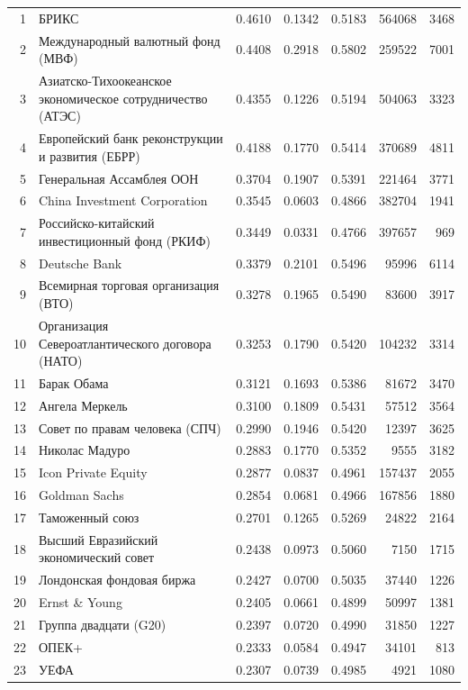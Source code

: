 {\begin{longtable}{r >{\raggedright\arraybackslash}p{4.2cm} S[table-format=1.4] S[table-format=1.4] S[table-format=1.4] r r}
1 & БРИКС & 0.4610 & 0.1342 & 0.5183 & 564068 & 3468 \\
2 & Международный валютный фонд (МВФ) & 0.4408 & 0.2918 & 0.5802 & 259522 & 7001 \\
3 & Азиатско-Тихоокеанское экономическое сотрудничество (АТЭС) & 0.4355 & 0.1226 & 0.5194 & 504063 & 3323 \\
4 & Европейский банк реконструкции и развития (ЕБРР) & 0.4188 & 0.1770 & 0.5414 & 370689 & 4811 \\
5 & Генеральная Ассамблея ООН & 0.3704 & 0.1907 & 0.5391 & 221464 & 3771 \\
6 & China Investment Corporation & 0.3545 & 0.0603 & 0.4866 & 382704 & 1941 \\
7 & Российско-китайский инвестиционный фонд (РКИФ) & 0.3449 & 0.0331 & 0.4766 & 397657 & 969 \\
8 & Deutsche Bank & 0.3379 & 0.2101 & 0.5496 & 95996 & 6114 \\
9 & Всемирная торговая организация (ВТО) & 0.3278 & 0.1965 & 0.5490 & 83600 & 3917 \\
10 & Организация Североатлантического договора (НАТО) & 0.3253 & 0.1790 & 0.5420 & 104232 & 3314 \\
11 & Барак Обама & 0.3121 & 0.1693 & 0.5386 & 81672 & 3470 \\
12 & Ангела Меркель & 0.3100 & 0.1809 & 0.5431 & 57512 & 3564 \\
13 & Совет по правам человека (СПЧ) & 0.2990 & 0.1946 & 0.5420 & 12397 & 3625 \\
14 & Николас Мадуро & 0.2883 & 0.1770 & 0.5352 & 9555 & 3182 \\
15 & Icon Private Equity & 0.2877 & 0.0837 & 0.4961 & 157437 & 2055 \\
16 & Goldman Sachs & 0.2854 & 0.0681 & 0.4966 & 167856 & 1880 \\
17 & Таможенный союз & 0.2701 & 0.1265 & 0.5269 & 24822 & 2164 \\
18 & Высший Евразийский экономический совет & 0.2438 & 0.0973 & 0.5060 & 7150 & 1715 \\
19 & Лондонская фондовая биржа & 0.2427 & 0.0700 & 0.5035 & 37440 & 1226 \\
20 & Ernst \& Young & 0.2405 & 0.0661 & 0.4899 & 50997 & 1381 \\
21 & Группа двадцати (G20) & 0.2397 & 0.0720 & 0.4990 & 31850 & 1227 \\
22 & ОПЕК+ & 0.2333 & 0.0584 & 0.4947 & 34101 & 813 \\
23 & УЕФА & 0.2307 & 0.0739 & 0.4985 & 4921 & 1080 \\

\end{longtable}}
